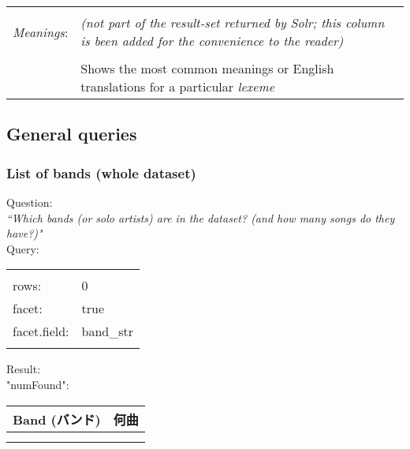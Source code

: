 \begin{longtable}{l p{11.5cm}}
& \\

\emph{Meanings}:
&
\emph{(not part of the result-set returned by Solr; this column is been added for the convenience to the reader)}
\\
& \\
& Shows the most common meanings or English translations for a particular \emph{lexeme}
\\


\end{longtable}

\newpage

\subsection{General queries}  \label{general-queries}




\subsubsection{List of bands (whole dataset)} \label{query-list-of-bands}

Question: \\
\emph{``Which bands (or solo artists) are in the dataset? (and how many songs do they have?)"} \\


Query:

\begin{tabular}{|l|l|}
	\hline
	& \\
	rows: & 0 \\
	facet: & true \\
	facet.field: & band\_str \\
	& \\
	\hline
\end{tabular}



\bigskip
Result: \\

"numFound":


\begin{longtable}{|l l|r|}
	\hline
	\multicolumn{2}{|c|}{Band (バンド)} & 
	\multicolumn{1}{|c|}{何曲}
	\\
	\hline
	& & \\
	\endhead
	
	\hline
	\endfoot
	
	
	& & \\
\end{longtable}

